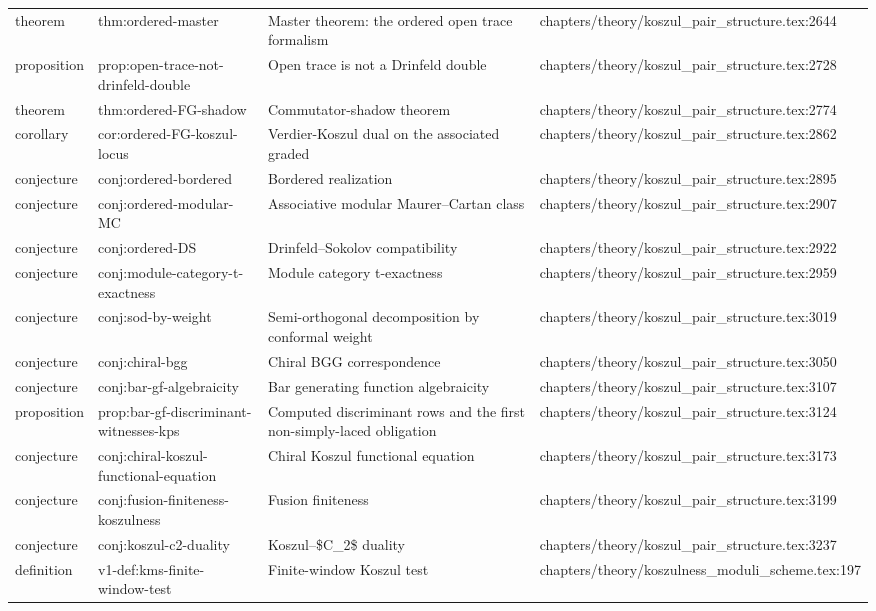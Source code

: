 \documentclass[11pt]{article}
\begin{document}
\begin{longtable}{L{0.10\textwidth}L{0.26\textwidth}L{0.42\textwidth}L{0.22\textwidth}}
theorem & thm:ordered-master & Master theorem: the ordered op{}en trace formalism & chapters/theory/koszul\_pair\_structure.tex:2644\\
proposition & prop:op{}en-trace-not-drinfeld-double & Op{}en trace is not a Drinfeld double & chapters/theory/koszul\_pair\_structure.tex:2728\\
theorem & thm:ordered-FG-shadow & Commutator-shadow theorem & chapters/theory/koszul\_pair\_structure.tex:2774\\
corollary & cor:ordered-FG-koszul-locus & Verdier-Koszul dual on the associated graded & chapters/theory/koszul\_pair\_structure.tex:2862\\
conjecture & conj:ordered-bordered & Bordered realization & chapters/theory/koszul\_pair\_structure.tex:2895\\
conjecture & conj:ordered-modular-MC & Associative modular Maurer--Cartan class & chapters/theory/koszul\_pair\_structure.tex:2907\\
conjecture & conj:ordered-DS & Drinfeld--Sokolov compatibility & chapters/theory/koszul\_pair\_structure.tex:2922\\
conjecture & conj:module-category-t-exactness & Module category t-exactness & chapters/theory/koszul\_pair\_structure.tex:2959\\
conjecture & conj:sod-by-weight & Semi-orthogonal decomposition by conformal weight & chapters/theory/koszul\_pair\_structure.tex:3019\\
conjecture & conj:chiral-bgg & Chiral BGG correspondence & chapters/theory/koszul\_pair\_structure.tex:3050\\
conjecture & conj:bar-gf-algebraicity & Bar generating function algebraicity & chapters/theory/koszul\_pair\_structure.tex:3107\\
proposition & prop:bar-gf-discriminant-witnesses-kps & Computed discriminant rows and the first non-simply-laced obligation & chapters/theory/koszul\_pair\_structure.tex:3124\\
conjecture & conj:chiral-koszul-functional-equation & Chiral Koszul functional equation & chapters/theory/koszul\_pair\_structure.tex:3173\\
conjecture & conj:fusion-finiteness-koszulness & Fusion finiteness & chapters/theory/koszul\_pair\_structure.tex:3199\\
conjecture & conj:koszul-c2-duality & Koszul--\$C\_2\$ duality & chapters/theory/koszul\_pair\_structure.tex:3237\\
definition & v1-def:kms-finite-window-test & Finite-window Koszul test & chapters/theory/koszulness\_moduli\_scheme.tex:197\\

\end{longtable}
\end{document}
